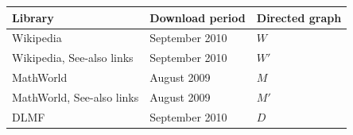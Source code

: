 \begin{tabular}{lll}
\hline
Library & Download period & Directed graph \\
\hline
Wikipedia & September 2010 & $W$ \\
Wikipedia, See-also links & September 2010 & $W'$ \\
MathWorld & August 2009 & $M$ \\
MathWorld, See-also links & August 2009 & $M'$ \\
DLMF & September 2010 & $D$ \\
\hline
\end{tabular}
